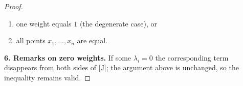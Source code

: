 \begin{proof}
\begin{enumerate}
\item one weight equals $1$ (the degenerate case), or
\item all points $x_{1},\dots,x_{n}$ are equal.
\end{enumerate}

\medskip
\textbf{6. Remarks on zero weights.}  
If some $\lambda_{i}=0$ the corresponding term disappears from both sides
of \eqref{J}; the argument above is unchanged, so the inequality remains
valid.
\end{proof}
